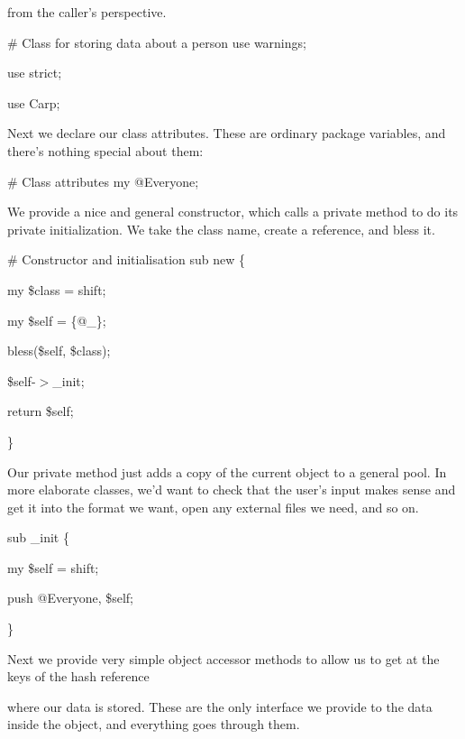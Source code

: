 \documentclass[a4paper,11pt]{book}
\begin{document}
\noindent from the caller's perspective.

\noindent 

\noindent \# Class for storing data about a person use warnings;

\noindent use strict;

\noindent use Carp;

\noindent 

\noindent Next we declare our class attributes. These are ordinary package variables, and there's nothing special about them:

\noindent 

\noindent \# Class attributes my @Everyone;

\noindent 

\noindent We provide a nice and general constructor, which calls a private method to do its private initialization. We take the class name, create a reference, and bless it.

\noindent 

\noindent \# Constructor and initialisation sub new \{

\noindent my \$class = shift;

\noindent my \$self = \{@\_\};

\noindent bless(\$self, \$class);

\noindent \$self-$>$\_init;

\noindent return \$self;

\noindent \}

\noindent 

\noindent Our private method just adds a copy of the current object to a general pool. In more elaborate classes, we'd want to check that the user's input makes sense and get it into the format we want, open any external files we need, and so on.

\noindent 

\noindent sub \_init \{

\noindent my \$self = shift;

\noindent push @Everyone, \$self;

\noindent \}

\noindent 

\noindent 

\noindent Next we provide very simple object accessor methods to allow us to get at the keys of the hash reference

\noindent where our data is stored. These are the only interface we provide to the data inside the object, and everything goes through them.
\end{document}
